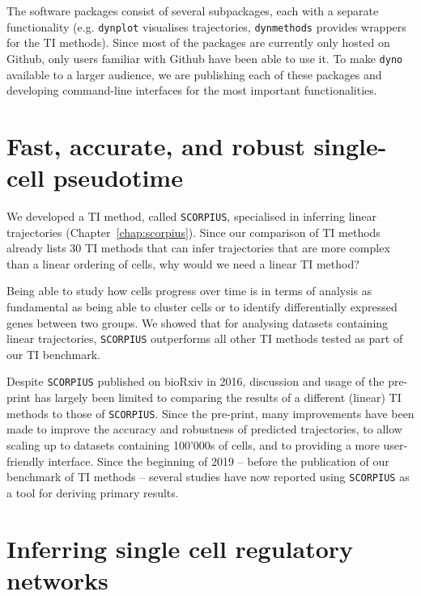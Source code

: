 The software packages consist of several subpackages, each with a separate functionality (e.g. \texttt{dynplot} visualises trajectories, \texttt{dynmethods} provides wrappers for the TI methods). Since most of the packages are currently only hosted on Github, only users familiar with Github have been able to use it. To make \texttt{dyno} available to a larger audience, we are publishing each of these packages and developing command-line interfaces for the most important functionalities.



\section{Fast, accurate, and robust single-cell pseudotime}

We developed a TI method, called \texttt{SCORPIUS}, specialised in inferring linear trajectories (Chapter~\ref{chap:scorpius}). Since our comparison of TI methods already lists 30 TI methods that can infer trajectories that are more complex than a linear ordering of cells, why would we need a linear TI method?

Being able to study how cells progress over time is in terms of analysis as fundamental as being able to cluster cells or to identify differentially expressed genes between two groups. We showed that for analysing datasets containing linear trajectories, \texttt{SCORPIUS} outperforms all other TI methods tested as part of our TI benchmark. 

Despite \texttt{SCORPIUS} published on bioRxiv in 2016, discussion and usage of the pre-print has largely been limited to comparing the results of a different (linear) TI methods to those of \texttt{SCORPIUS}. Since the pre-print, many improvements have been made to improve the accuracy and robustness of predicted trajectories, to allow scaling up to datasets containing 100'000s of cells, and to providing a more user-friendly interface. Since the beginning of 2019 -- before the publication of our benchmark of TI methods -- several studies have now reported using \texttt{SCORPIUS} as a tool for deriving primary results\cite{damond_maphumantype_2019, cheng_multifactorialheterogeneityvirusspecific_2019, tibbitt_singlecellrnasequencing_2019, hove_singlecellatlasmouse_2019, wouters_singlecellgeneregulatory_2019}.


\section{Inferring single cell regulatory networks}

